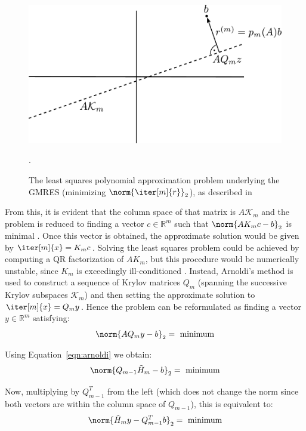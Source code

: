 \begin{figure}[h]
    \centering
    \includegraphics[width=0.7\linewidth]{figures/GMRES.pdf}
    \caption{The least squares polynomial approximation problem underlying the GMRES (minimizing $\norm{\iter[m]{r}}_2$), as described in \cite{trefethen_numerical_1997}}.
    \label{fig:gmres}
\end{figure}

\noindent From this, it is evident that the column space of that matrix is $A\mathcal{K}_m$ and the problem is reduced to finding a vector $c \in \mathbb{R}^{m}$ such that $\norm{AK_mc-b}_2$ is minimal   \cite{trefethen_numerical_1997}. Once this vector is obtained, the approximate solution would be given by $\iter[m]{x} =K_mc$. Solving the least squares problem could be achieved by computing a QR factorization of $AK_m$, but this procedure would be numerically unstable, since $K_m$ is exceedingly ill-conditioned \cite{trefethen_numerical_1997}. Instead, Arnoldi's method is used to construct a sequence of Krylov matrices $Q_m$ (spanning the successive Krylov subspaces $\mathcal{K}_m$) and then setting the approximate solution to $\iter[m]{x} = Q_my$. Hence the problem can be reformulated as finding a vector $y \in \mathbb{R}^m$ satisfying:
\begin{equation}
    \norm{AQ_my-b}_2=\text{ minimum}
\end{equation}

\noindent Using Equation~\hyperref[eqn:arnoldi]{\ref{eqn:arnoldi}} we obtain:
\begin{equation}
    \norm{Q_{m-1}\tilde{H}_m-b}_2=\text{ minimum}
\end{equation}

\noindent Now, multiplying by $Q^T_{m-1}$ from the left (which does not change the norm since both vectors are within the column space of $Q_{m-1}$), this is equivalent to:
\begin{equation}
    \norm{\tilde{H}_my-Q^T_{m-1}b}_2 = \text{ minimum}
\end{equation}

